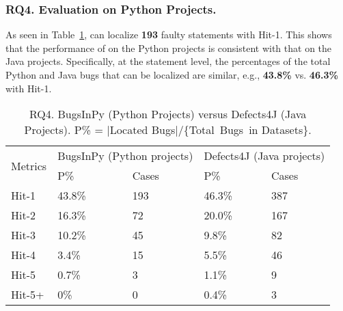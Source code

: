 \subsubsection{\bf RQ4. Evaluation on Python Projects.}
As seen in Table~\ref{RQ4}, {\tool} can localize {\bf 193} faulty
statements with Hit-1. This shows that the
performance of {\tool} on the Python projects is consistent with that
on the Java projects. Specifically, at the statement level, the
percentages of the total Python and Java bugs that can be localized
are similar, e.g., {\bf 43.8\%} vs. {\bf 46.3\%} with Hit-1.



\begin{table}[t]
	\caption{RQ4. BugsInPy (Python Projects) versus Defects4J (Java Projects). P\% = $|$Located Bugs$|$/\{Total~Bugs~in Datasets\}.}
	\vspace{-5pt}
	{\footnotesize
		\begin{center}
			\tabcolsep 2.7pt
			\begin{tabular}{p{1.4cm}<{\centering}|p{1.55cm}<{\centering}p{1.55cm}<{\centering}|p{1.55cm}<{\centering}p{1.55cm}<{\centering}}\hline\cline{2-5}	
				
		\multirow{2}{*}{Metrics}& \multicolumn{2}{c|}{BugsInPy (Python projects)} & \multicolumn{2}{c}{Defects4J (Java projects)}\\\cline{2-5}
				           & P\%& Cases &P\%& Cases \\ \hline
				
				Hit-1  &  43.8\%  &   193    & 46.3\%  &387\\ 
				\hline
				  
			    Hit-2  &  16.3\%  &   72   & 20.0\%  &167\\
				\hline
				
				 
				Hit-3  &  10.2\%  &  45     & 9.8\%  &82\\
				\hline
				
				Hit-4  &  3.4\%  &   15    & 5.5\%  &46\\
				\hline
				
				Hit-5  & 0.7\%   &   3    & 1.1\%  &9\\
				\hline
				
				Hit-5+ &  0\%  &   0    & 0.4\%  &3\\
				\hline
			\end{tabular}
			\label{RQ4}
		\end{center}
	}
\end{table}



